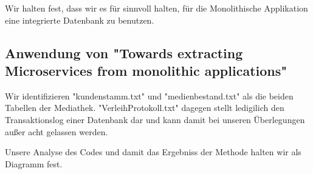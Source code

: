 \documentclass{article}
\begin{document}
Wir halten fest, dass wir es für sinnvoll halten, für die Monolithische Applikation eine integrierte Datenbank zu benutzen.

\subsection{Anwendung von "Towards extracting Microservices from monolithic applications"}

Wir identifizieren "kundenstamm.txt" und "medienbestand.txt" als die beiden Tabellen der Mediathek. "VerleihProtokoll.txt" dagegen stellt ledigilich den Transaktionslog einer Datenbank dar und kann damit bei unseren Überlegungen außer acht gelassen werden.

Unsere Analyse des Codes und damit das Ergebniss der Methode halten wir als Diagramm fest.
\end{document}
